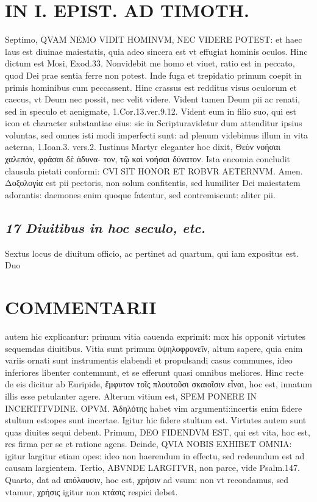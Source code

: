 \documentclass{article}
\begin{document}
\begin{pages}
\section*{IN I. EPIST. AD TIMOTH. }
\marginpar{[ p.167 ]}\pstart Septimo, QVAM NEMO VIDIT HOMINVM, NEC VIDERE POTEST: et haec laus est diuinae maiestatis, quia adeo sincera est vt effugiat hominis oculos. Hinc dictum est Mosi, Exod.33. Nonvidebit me homo et viuet, ratio est in peccato, quod Dei prae sentia ferre non potest. Inde fuga et trepidatio primum coepit in primis hominibus cum peccassent. Hinc crassus est redditus visus oculorum et caecus, vt Deum nec possit, nec velit videre. Vident tamen Deum pii ac renati, sed in speculo et aenigmate, 1.Cor.13.ver.9.12. Vident eum in filio suo, qui est icon et character substantiae eius: sic in Scripturavidetur dum attenditur ipsius voluntas, sed omnes isti modi imperfecti sunt: ad plenum videbimus illum in vita aeterna, 1.Ioan.3. vers.2. Iustinus Martyr eleganter hoc dixit, Θεὸν νοήσαι χαλεπόν, φράσαι δὲ ἀδυνα- τον, τῷ καὶ νοήσαι δύνατον. Ista encomia concludit clausula pietati conformi: CVI SIT HONOR ET ROBVR AETERNVM. Amen. Δοξολογία est pii pectoris, non solum confitentis, sed humiliter Dei maiestatem adorantis: daemones enim quoque fatentur, sed contremiscunt: aliter pii.  \pend
{}
{}
\subsection*{\textit{17 Diuitibus in hoc seculo, etc. }}\pstart Sextus locus de diuitum officio, ac pertinet ad quartum, qui iam expositus est. Duo  \pend
\section*{COMMENTARII }
\marginpar{[ p.168 ]}\pstart autem hic explicantur: primum vitia cauenda exprimit: mox his opponit virtutes sequemdas diuitibus. Vitia sunt primum ὑψηλοφρονεῖν, altum sapere, quia enim variis ornati sunt instrumentis elabendi et propulsandi casus communes, ideo inferiores libenter contemnunt, et se efferunt quasi omnibus meliores.  \pend\pstart Hinc recte de eis dicitur ab Euripide, ἔμφυτον τοῖς πλουτοῦσι σκαιοῖσιν εἶναι, hoc est, innatum illis esse petulanter agere. Alterum vitium est, SPEM PONERE IN INCERTITVDINE. OPVM. Ἀδηλότης  habet vim argumenti:incertis enim fidere stultum est:opes sunt incertae. Igitur hic fidere stultum est.  \pend\pstart Virtutes autem sunt quas diuites sequi debent. Primum, DEO FIDENDVM EST, qui est vita, hoc est, res firma per se et ratione agens. Deinde, QVIA NOBIS EXHIBET OMNIA: igitur largitur etiam opes: ideo non haerendum in effectu, sed redeundum est ad causam largientem. Tertio, ABVNDE LARGITVR, non parce, vide Psalm.147. Quarto, dat ad απόλαυσιν, hoc est, χρήσιν ad vsum: non vt recondamus, sed vtamur, χρήσις igitur non κτάσις respici debet.  \pend
{}
{}

\end{pages}
\end{document}
